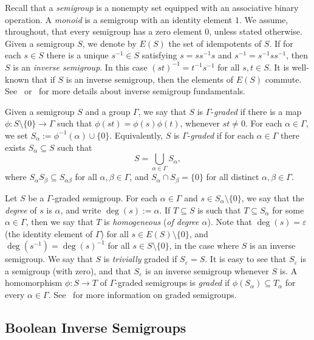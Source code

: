 \documentclass[a4paper,reqno,12pt]{amsart}
\numberwithin{equation}{section}
\theoremstyle{plain}
\theoremstyle{definition}
\newcommand{\G}{\Gamma}
\def\a{\alpha}
\def\b{\beta}
\begin{document}
Recall that a \emph{semigroup} is a nonempty set equipped with an associative binary operation. A \emph{monoid} is a semigroup with an identity element $1$. We assume, throughout, that every semigroup has a zero element $0$, unless stated otherwise. Given a semigroup $S$, we denote by $E(S)$ the set of idempotents of $S$. If for each $s \in S$ there is a unique $s^{-1} \in S$ satisfying $s = ss^{-1}s$ and $s^{-1} = s^{-1}ss^{-1}$, then $S$ is an \emph{inverse semigroup}. In this case $(st)^{-1} = t^{-1}s^{-1}$ for all $s,t \in S$. It is well-known that if $S$ is an inverse semigroup, then the elements of $E(S)$ commute. See~\cite[\S 5]{Howie} or~\cite{Lawson1} for more details about inverse semigroup fundamentals.

Given a semigroup $S$ and a group $\Gamma$, we say that $S$ is $\Gamma$-\emph{graded} if there is a map $\phi : S \setminus\{0\} \to \Gamma$ such that $\phi(st) = \phi(s)\phi(t)$, whenever $st \not= 0$. For each $\alpha \in \Gamma$, we set $S_\alpha:=\phi^{-1}(\alpha) \cup \{0\}$. Equivalently, $S$ is $\Gamma$-\emph{graded} if for each $\alpha \in \Gamma$ there exists $S_\alpha \subseteq S$ such that
\[S = \bigcup_{\alpha \in \G} S_\alpha,\]
where $S_\a S_\b \subseteq S_{\a\b}$ for all $\a,\b \in \Gamma$, and $S_\a \cap S_\b = \{0\}$ for all distinct $\a,\b \in \Gamma$.

Let $S$ be a $\Gamma$-graded semigroup. For each $\a \in \Gamma$ and $s \in S_\alpha \setminus \{0\}$, we say that the \emph{degree} of $s$ is $\alpha$, and write $\deg(s):=\alpha$. If $T \subseteq S$ is such that $T \subseteq S_{\alpha}$ for some $\alpha \in \Gamma$, then we say that $T$ is \emph{homogeneous} (\emph{of degree $\alpha$}). Note that $\deg(s)=\varepsilon$ (the identity element of $\Gamma$) for all $s \in E(S) \setminus \{0\}$, and $\deg(s^{-1}) = \deg(s)^{-1}$ for all $s \in S \setminus \{0\}$, in the case where $S$ is an inverse semigroup. We say that $S$ is \emph{trivially} graded if $S_\varepsilon = S$. It is easy to see that $S_{\varepsilon}$ is a semigroup (with zero), and that $S_\varepsilon$ is an inverse semigroup whenever $S$ is. A homomorphism $\phi:S \rightarrow T$ of $\Gamma$-graded semigroups is \emph{graded} if $\phi(S_\alpha)\subseteq T_\alpha$ for every $\alpha \in \Gamma$. See~\cite{RZ} for more information on graded semigroups.

\subsection{Boolean Inverse Semigroups} \label{bool-def-sect}
\end{document}
